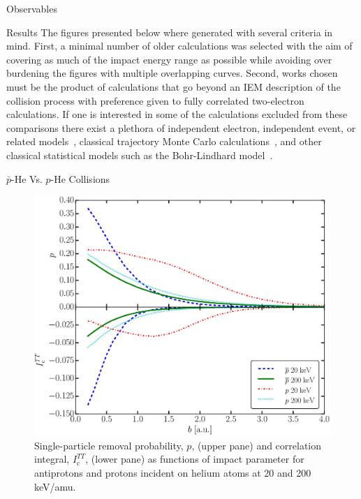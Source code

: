 \documentclass[letterpaper, 11 pt]{report}
\begin{document}
\begin{chapter}{Observables \label{chap:p-he2p-he}}
\begin{section}{Results \label{sec:phe2p-res}}
      The figures presented below where generated with several criteria in mind. First, a minimal number
      of older calculations was selected with the aim of covering as much of the impact energy range as
      possible while avoiding over burdening the figures with multiple overlapping curves. Second, works
      chosen must be the product of calculations that go beyond an IEM description of the collision
      process with preference given to fully correlated two-electron calculations. If one is interested
      in some of the calculations excluded from these comparisons there exist a plethora of independent
      electron, independent event, or related models~\cite{SLD-83, DMR-84, SLD-85, GM-86, CM-87, GM-87,
      JLF-89, DC-90, DC-91a, DC-91b, DG-91, SKG-91, SL-91, Kuang-92, MLC-93, CM-94, CSR-95, BDM-96,
      MBGH-97, McCartney-97, Mccartney-99, GAMRF-02, GFS-02, AMRF-04, BLMC-04, FRBJG-06, FJG-07,
      GIFK-08, ZK-09, G-11, LFG-11, GG-12}, classical trajectory Monte Carlo calculations~\cite{ZM-85,
      OWM-86, MO-87, WO-88, MS-89, Cohen-96, TH-96, MMTH-02, DAKW-04, GEP-09}, and other classical
      statistical models such as the Bohr-Lindhard model~\cite{DYC-08,Ding-12}. 

      \begin{subsection}{ \texorpdfstring{$\bar{p}$}{pbar}-He Vs. \texorpdfstring{$p$}{p}-He Collisions
                         \label{sec:pbarhe-res}}

         \begin{figure}[htp]
            \centering
            \includegraphics[width = 0.49\linewidth]{./images/p-ic.eps}
            \caption[Single-particle removal and correlation integral]
                    {Single-particle removal probability, $p$, (upper pane) and
                     correlation integral, $I_\mathrm{c}^{TT}$, (lower pane) as functions of impact
                     parameter for antiprotons and protons incident on helium atoms at 20 and
                     200 keV/amu. \label{fig:p-ic}}
         \end{figure}


\end{subsection}
\end{section}
\end{chapter}
\end{document}
